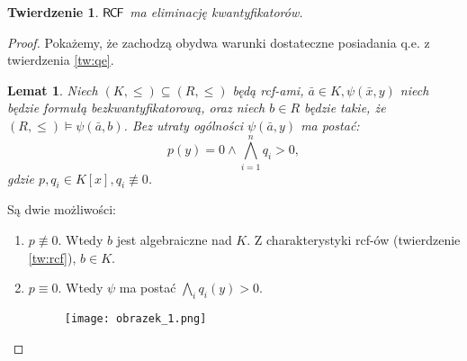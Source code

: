 \documentclass{article}
\theoremstyle{plain}
\newtheorem{tw}[thm]{Twierdzenie}
\newtheorem{lem}[thm]{Lemat}
\theoremstyle{definition}
\theoremstyle{remark}
\newcommand{\RCF}{\mathsf{R \mkern-1.7mu C \mkern-1.4mu F}}
\begin{document}
\begin{tw}
	 $ \RCF$ ma eliminację kwantyfikatorów.
\end{tw}
\begin{proof}
	Pokażemy, że zachodzą obydwa warunki dostateczne posiadania q.e. z
	twierdzenia \ref{tw:qe}.
	\begin{lem} %
		Niech $ (K, \leq) \subseteq (R, \leq)$ będą rcf-ami,
		$ \bar{a} \in K, \psi(\bar{x}, y)$ niech będzie formułą
		bezkwantyfikatorową,
		oraz niech $ b \in R$ będzie takie, że $(R, \leq) \models
		\psi(\bar{a}, b)$.
		Bez utraty ogólności $ \psi(\bar{a}, y)$ ma postać:
		\[
			p(y) = 0 \wedge \bigwedge_{ i = 1 }^n q_i > 0,
		\]
		gdzie $ p, q_i \in K[x], q_i \not \equiv 0$.
	\end{lem}
	Są dwie możliwości:
	\begin{enumerate}
		\item $ p \not \equiv 0$.
			Wtedy $ b$ jest algebraiczne nad $ K$.
			Z charakterystyki rcf-ów (twierdzenie \ref{tw:rcf}),
			$b \in K$.
		\item $p \equiv 0$.
			Wtedy $\psi$ ma postać $\bigwedge_{ i } q_i(y) > 0$.
			\begin{figure}[!h]
				\centering
				\texttt{[image: obrazek\_1.png]}
			\end{figure}


\end{enumerate}
\end{proof}
\end{document}
